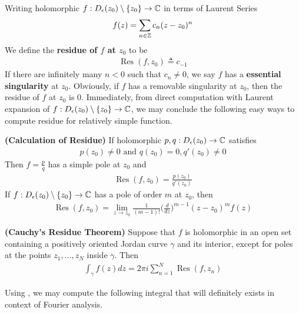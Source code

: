 \documentclass{report}
\begin{document}
\begin{mdframed}
Writing holomorphic $f:D_\epsilon (z_0)\setminus \{ z_0 \}\rightarrow \mathbb{C}$ in terms of Laurent Series  
\begin{align*}
f(z)= \sum_{n\in\mathbb{Z}} c_n (z-z_0)^n 
\end{align*}
We define the \textbf{residue of $f$ at  $z_0$} to be 
\begin{align*}
\operatorname{Res}(f,z_0)\triangleq c_{-1}
\end{align*}
If there are infinitely many $n<0$ such that $c_n\neq 0$, we say $f$ has a \textbf{essential singularity} at $z_0$. Obviously, if  $f$ has a removable singularity at  $z_0$, then the residue of  $f$ at $z_0$ is  $0$. Immediately, from direct computation with Laurent expansion of $f:D_\epsilon (z_0)\setminus \{ z_0 \}\rightarrow \mathbb{C}$, we may conclude the following easy ways to compute residue for relatively simple function. 
\end{mdframed}
\begin{theorem}
\textbf{(Calculation of Residue)} If holomorphic $p,q:D_\epsilon (z_0)\rightarrow \mathbb{C}$ satisfies 
\begin{align*}
p(z_0)\neq 0\text{ and }q(z_0)=0,q'(z_0)\neq 0 
\end{align*}
Then $f=\frac{p}{q}$ has a simple pole at $z_0$ and 
 \begin{align*}
\operatorname{Res}(f,z_0)= \frac{p(z_0)}{q'(z_0)}
\end{align*}
If $f:D_\epsilon (z_0)\setminus \{ z_0 \}\rightarrow \mathbb{C}$ has a pole of order $m$ at  $z_0$,  then 
 \begin{align*}
\operatorname{Res}(f,z_0)=  \lim_{z\to z_0} \frac{1}{(m-1)!} \Big( \frac{d}{dz} \Big)^{m-1} (z-z_0)^m f(z)
\end{align*}
\end{theorem}
\begin{theorem}
\label{CRT}
\textbf{(Cauchy's Residue Theorem)} Suppose that $f$ is holomorphic in an open set containing a positively oriented  Jordan curve $\gamma $ and its interior, except for poles at the points $z_1,\dots ,z_N$ inside $\gamma $. Then 
\begin{align*}
\int_{\gamma }f(z)dz = 2\pi  i\sum_{n=1}^N \operatorname{Res} (f,z_n)
\end{align*}
\end{theorem}
\begin{mdframed}
  Using , we may compute the following integral that will definitely exists in context of Fourier analysis.   
\end{mdframed}
\end{document}

